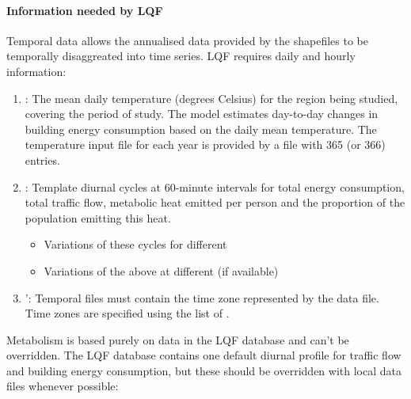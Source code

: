 \documentclass[letterpaper,10pt,english]{sphinxmanual}
\begin{document}
\paragraph{Information needed by LQF}
\label{\detokenize{OtherManuals/LQF_Manual:information-needed-by-lqf}}
Temporal data allows the annualised data provided by the shapefiles to
be temporally disaggreated into time series. LQF requires daily and
hourly information:
\begin{enumerate}
\item {} 
: The mean daily temperature (degrees Celsius)
for the region being studied, covering the period of study. The model
estimates day-to-day changes in building energy consumption based on
the daily mean temperature. The temperature input file for each year
is provided by a file with 365 (or 366) entries.

\item {} 
: Template diurnal cycles at 60-minute
intervals for total energy consumption, total traffic flow, metabolic
heat emitted per person and the proportion of the population emitting
this heat.
\begin{itemize}
\item {} 
Variations of these cycles for different 

\item {} 
Variations of the above at different  (if
available)

\end{itemize}

\item {} 
’: Temporal files must contain the time zone
represented by the data file. Time zones are specified using the list
of .

\end{enumerate}

Metabolism is based purely on data in the LQF database and can’t be
overridden. The LQF database contains one default diurnal profile for
traffic flow and building energy consumption, but these should be
overridden with local data files whenever possible:
\end{document}

